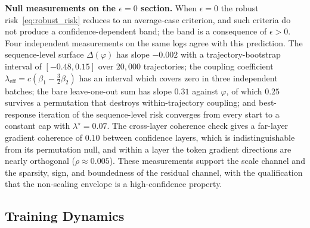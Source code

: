 \noindent\textbf{Null measurements on the $\epsilon=0$ section.}
When $\epsilon=0$ the robust risk~\eqref{eq:robust_risk} reduces to an average-case criterion, and such criteria do not produce a confidence-dependent band; the band is a consequence of $\epsilon>0$. Four independent measurements on the same logs agree with this prediction. The sequence-level surface $\Delta(\varphi)$ has slope $-0.002$ with a trajectory-bootstrap interval of $[-0.48,0.15]$ over $20{,}000$ trajectories; the coupling coefficient $\lambda_{\mathrm{eff}}=c(\beta_1-\tfrac32\beta_2)$ has an interval which covers zero in three independent batches; the bare leave-one-out sum has slope $0.31$ against $\varphi$, of which $0.25$ survives a permutation that destroys within-trajectory coupling; and best-response iteration of the sequence-level risk converges from every start to a constant cap with $\lambda^\star=0.07$. The cross-layer coherence check gives a far-layer gradient coherence of $0.10$ between confidence layers, which is indistinguishable from its permutation null, and within a layer the token gradient directions are nearly orthogonal ($\rho\approx0.005$). These measurements support the scale channel and the sparsity, sign, and boundedness of the residual channel, with the qualification that the non-scaling envelope is a high-confidence property.

\subsection{Training Dynamics}
\label{app:experimental-dynamics}

